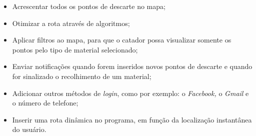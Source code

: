 \begin{itemize}
	\item Acrescentar todos os pontos de descarte no mapa;
	\item Otimizar a rota através de algoritmos;
	\item Aplicar filtros ao mapa, para que o catador possa visualizar somente os pontos pelo tipo de material selecionado;
	\item Enviar notificações quando forem inseridos novos pontos de descarte e quando for sinalizado o recolhimento de um material;
\setlength{\parskip}{9.96pt}
	\item Adicionar outros métodos de \textit{login}, como por exemplo: o \textit{Facebook, }o \textit{Gmail }e o número de telefone;
	\item Inserir uma rota dinâmica no programa, em função da localização instantânea do usuário.
\end{itemize}

 \glsaddall